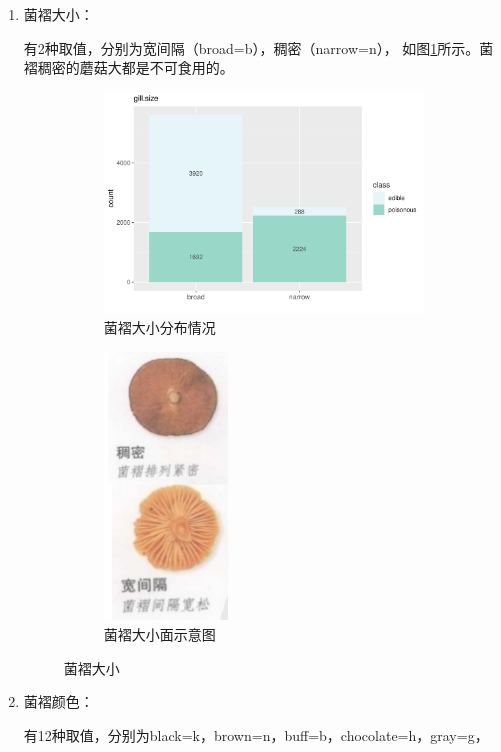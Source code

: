 \documentclass[lang=cn,11pt,a4paper,cite=super]{elegantpaper}
\begin{document}
\begin{enumerate}
   \item 菌褶大小：\par 有2种取值，分别为宽间隔（broad=b），稠密（narrow=n），
   如图\ref{fig:gillsi}所示。菌褶稠密的蘑菇大都是不可食用的。
   \begin{figure}[htb]
      \begin{subfigure}[b]{0.69\textwidth}
        \centering
        \includegraphics[width=\linewidth]{img/gillsize-1.pdf}  
      \caption{菌褶大小分布情况}
      \end{subfigure}
      \begin{subfigure}[b]{0.3\textwidth}
        \centering
        \includegraphics[width=0.8\linewidth,height=2.8in]{img/gillsize.PNG}  
        \caption{菌褶大小面示意图}
      \end{subfigure}
      \caption{菌褶大小}
      \label{fig:gillsi}
   \end{figure}  
   \item 菌褶颜色：\par 有12种取值，分别为black=k，brown=n，buff=b，chocolate=h，gray=g，

\end{enumerate}
\end{document}
